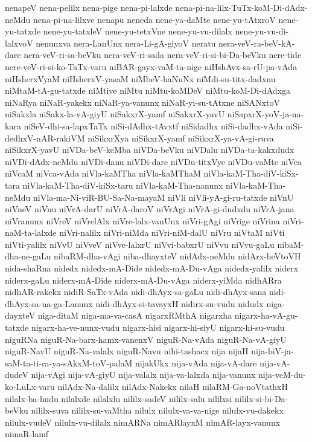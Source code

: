 {nenapeV
nena-pelilx
nena-pige
nena-pi-lalxde
nena-pi-na-lilx-TuTx-koM-Di-dAdx-neMdu
nena-pi-na-lilxve
nenapu
neneda
nene-ya-daMte
nene-yu-tAtxroV
nene-yu-tatxde
nene-yu-tatxleV
nene-yu-tetxVne
nene-yu-vu-dilalx
nene-yu-vu-di-lalxvoV
nenunxva
nera-LanUnx
nera-Li-gA-giyoV
neratu
nera-veV-ra-beV-kA-dare
nera-veV-ri-sa-beVku
nera-veV-ri-sada
nera-veV-ri-si-bi-Da-beVku
nere-tide
nere-veV-ri-si-ko-TaTx-varu
niBAR-gayx-vaM-ta-nige
niHshAvx-sa-rU-pa-vAda
niHsherxVyaM
niHsherxV-yasaM
niMbeV-haNuNx
niMdi-su-titx-dadxnu
niMtaM-tA-gu-tatxde
niMtive
niMtu
niMtu-koMDeV
niMtu-koM-Di-dAdxga
niNaRya
niNaR-yakekx
niNaR-ya-vanunx
niNaR-yi-su-tAtxne
niSANxtoV
niSakxla
niSakx-la-vA-giyU
niSakxrX-yamf
niSakxrX-yavU
niSapxrX-yoV-ja-na-kara
niSeV-dhi-sa-lapxTaTx
niSi-dAdhx-tAvxtf
niSidadhx
niSi-dadhx-vAda
niSi-dedhxV-nAR-rakiVM
niSikxrXya
niSikxrX-yamf
niSikxrX-ya-vA-gi-ruva
niSikxrX-yavU
niVDa-beV-keMba
niVDa-beVku
niVDalu
niVDa-ta-kakxdudx
niVDi-dAdx-neMdu
niVDi-danu
niVDi-dare
niVDu-titxVye
niVDu-vaMte
niVca
niVcaM
niVca-vAda
niVla-kaMTha
niVla-kaMThaM
niVla-kaM-Tha-diV-kiSx-tara
niVla-kaM-Tha-diV-kiSx-taru
niVla-kaM-Tha-nanunx
niVla-kaM-Tha-neMdu
niVla-ma-Ni-viR-BU-Sa-Na-mayaM
niVli
niVli-yA-gi-ru-tatxde
niVnU
niVneV
niVnu
niVrA-darU
niVrA-daroV
niVrAgi
niVrA-gi-dudxdu
niVrA-jana
niVranunx
niVreV
niVrelAlx
niVre-lalx-vanUnx
niVri-gAgi
niVrige
niVrina
niVri-naM-ta-lalxde
niVri-nalilx
niVri-niMda
niVri-niM-dalU
niVru
niVtaM
niVti
niVti-yalilx
niVvU
niVveV
niVve-lalxrU
niVvi-babxrU
niVvu
niVvu-gaLu
nibaM-dha-ne-gaLu
nibaRM-dha-vAgi
niba-dhayxteV
nidAdx-neMdu
nidArx-heVtoVH
nida-shaRna
nidedx
nidedx-mA-Dide
nidedx-mA-Du-vAga
nidedx-yalilx
niderx
niderx-gaLu
niderx-mA-Dide
niderx-mA-Du-vAga
niderx-yiMda
nidhARra
nidhAR-rakekx
nidiR-SaTx-vAda
nidi-dhAyx-sa-gaLu
nidi-dhAyx-sana
nidi-dhAyx-sa-na-ga-Lanunx
nidi-dhAyx-si-tavayxH
nidirx-su-vudu
nidudx
niga-dayxteV
niga-ditaM
niga-ma-va-casA
nigarxRMthA
nigarxha
nigarx-ha-vA-gu-tatxde
nigarx-ha-ve-nunx-vudu
nigarx-hisi
nigarx-hi-siyU
nigarx-hi-su-vudu
niguRNa
niguR-Na-barx-hamx-vanenxV
niguR-Na-vAda
niguR-Na-vA-giyU
niguR-NavU
niguR-Na-valalx
niguR-Navu
nihi-tashacx
nija
nijaH
nija-biV-ja-saM-ta-ti-ra-ya-sAkxM-toV-palaM
nijakUkx
nija-vAda
nija-vA-dare
nija-vA-dudeV
nija-vAgi
nija-vA-giyU
nija-valalx
nija-va-lalxda
nija-vanunx
nija-veM-du-ko-LuLx-varu
nilAdx-Na-dalilx
nilAdx-Nakekx
nilaH
nilaRM-Ga-noVtathxH
nilalx-ba-hudu
nilalxde
nilalxlu
nililx-sadeV
nililx-salu
nililxsi
nililx-si-bi-Da-beVku
nililx-suva
nililx-su-vaMtha
nilulx
nilulx-va-va-nige
nilulx-vu-dakekx
nilulx-vudeV
nilulx-vu-dilalx
nimARNa
nimARlayxM
nimAR-layx-vanunx
nimaR-lamf
}

